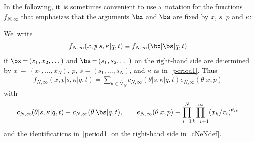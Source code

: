In the following, it~is sometimes convenient to use a~notation for the functions $f_{N,\infty}$ that emphasizes that the arguments $\bx$ and $\bs$ are fixed by $x$, $s$, $p$ and $\kappa$:

\begin{Definition}
\label{def:fNinfty}
We~write
\begin{gather*}
f_{N,\infty}(x,p|s,\kappa|q,t) \equiv f_{N,\infty}(\bx|\bs|q,t)
\end{gather*}
if $\bx\,{=}\,(x_1,x_2,\dots)$ and $\bs\,{=}\,(s_1,s_2,\dots)$ on the right-hand side are determined by $x\,{=}\,(x_1,\dots,x_N)$, $p$, $s=(s_1,\dots,s_N)$, and $\kappa$ as in~\eqref{period1}.
Thus
\begin{gather*}
f_{N,\infty}(x,p|s,\kappa|q,t) = \sum_{\theta\in\hat{\mathsf{M}}_N} c_{N,\infty}(\theta|s,\kappa|q,t)e_{N,\infty}(\theta|x,p)
\end{gather*}
with
\begin{gather}\label{cNeNdef}
c_{N,\infty}(\theta|s,\kappa|q,t) \equiv c_{N,\infty}(\theta|\bs|q,t),
\qquad
e_{N,\infty}(\theta|x,p)\equiv \prod_{i=1}^N \prod_{k=i+1}^\infty (x_k/x_i)^{\theta_{ik}}
\end{gather}
and the identifications in~\eqref{period1} on the right-hand side in~\eqref{cNeNdef}.
\end{Definition}
